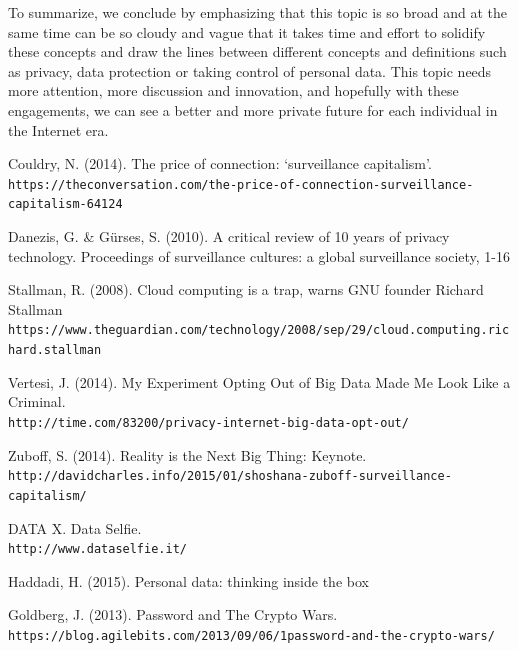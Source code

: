 \documentclass[format=acmsmall, review=false, screen=true]{acmart}
\begin{document}
To summarize, we conclude by emphasizing that this topic is so broad and at the same time can be so cloudy and vague that it takes time and effort to solidify these concepts and draw the lines between different concepts and definitions such as privacy, data protection or taking control of personal data. This topic needs more attention, more discussion and innovation, and hopefully with these engagements, we can see a better and more private future for each individual in the Internet era.
\newpage
\begin{thebibliography}{9}
Couldry, N. (2014). The price of connection: ‘surveillance capitalism’.
\\\texttt{https://theconversation.com/the-price-of-connection-surveillance-capitalism-64124}
 
Danezis, G. {\&} Gürses, S. (2010). A critical review of 10 years of privacy technology. Proceedings of surveillance cultures: a global surveillance society, 1-16

 
Stallman, R. (2008). Cloud computing is a trap, warns GNU founder Richard Stallman\\\texttt{https://www.theguardian.com/technology/2008/sep/29/cloud.computing.richard.stallman}

Vertesi, J. (2014). My Experiment Opting Out of Big Data Made Me Look Like a Criminal.
\\\texttt{http://time.com/83200/privacy-internet-big-data-opt-out/}

Zuboff, S. (2014). Reality is the Next Big Thing: Keynote.
\\\texttt{http://davidcharles.info/2015/01/shoshana-zuboff-surveillance-capitalism/}

DATA X. Data Selfie.
\\\texttt{http://www.dataselfie.it/}

Haddadi, H. (2015). Personal data: thinking inside the box

Goldberg, J. (2013). Password and The Crypto Wars. \\\texttt{https://blog.agilebits.com/2013/09/06/1password-and-the-crypto-wars/}

\end{thebibliography}
\end{document}
